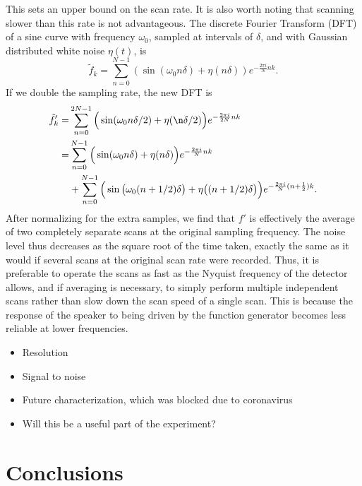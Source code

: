 \documentclass[12pt]{puthesis}
\begin{document}
This sets an upper bound on the scan rate. It is also worth noting that scanning slower than this rate is not advantageous. The discrete Fourier Transform (DFT) of a sine curve with frequency $\omega_{0}$, sampled at intervals of $\delta$, and with Gaussian distributed white noise $\eta(t)$, is 
\begin{equation}\label{eq:10}
\tilde f_{k} = \sum_{n=0}^{N-1}\left(\sin (\omega_{0}n\delta) +\eta(n\delta)\right)e^{-\frac{2\pi i}{N}nk}. 
\end{equation}
If we double the sampling rate, the new DFT is 
\begin{align}
  \tilde f'_{k}
  =& \sum_{n=0}^{2N-1}\Big(\sin(\omega_{0}n\delta/2) + \eta(\n\delta/2)\Big)e^{-\frac{2\pi i}{2N}nk}\nonumber \\
  =& \sum_{n=0}^{N-1}\Big(\sin(\omega_{0}n\delta)+\eta(n\delta)\Big)e^{-\frac{2\pi i}{N}nk}\nonumber \\
  &+ \sum_{n=0}^{N-1}\Big(\sin\big(\omega_{0}(n+1/2)\delta\big) + \eta\big((n + 1/2)\delta\big) \Big)e^{-\frac{2\pi i}{N}(n+\frac{1}{2})k}.
  \label{eq:11}
\end{align}
After normalizing for the extra samples, we find that $f'$ is effectively the average of two completely separate scans at the original sampling frequency. The noise level thus decreases as the square root of the time taken, exactly the same as it would if several scans at the original scan rate were recorded. Thus, it is preferable to operate the scans as fast as the Nyquist frequency of the detector allows, and if averaging is necessary, to simply perform multiple independent scans rather than slow down the scan speed of a single scan. This is because the response of the speaker to being driven by the function generator becomes less reliable at lower frequencies.



\begin{itemize}
\item Resolution

\item Signal to noise 

\item Future characterization, which was blocked due to coronavirus 

\item Will this be a useful part of the experiment?
\end{itemize}



\chapter{Conclusions}





\singlespacing

\cleardoublepage
\ifdefined{}
\else
\fi
{}

\end{document}
